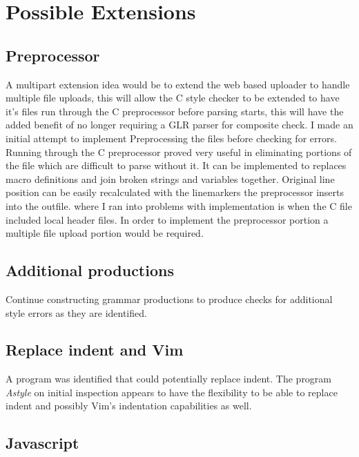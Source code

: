 \chapter{Possible Extensions}
\label{chap:EXTENSION}

\section{Preprocessor}

A multipart extension idea would be to extend the web based uploader to handle 
multiple file uploads, this will allow the C style checker to be extended to 
have it's files run through the C preprocessor before parsing starts, this will
have the added benefit of no longer requiring a GLR parser for composite check.
I made an initial attempt to implement Preprocessing the files before checking 
for errors. Running through the C preprocessor proved very useful in 
eliminating portions of the file which are difficult to parse without it. It 
can be implemented to replaces macro definitions and join broken strings and 
variables together. Original line position can be easily recalculated with the 
linemarkers the preprocessor inserts into the outfile. where I ran into 
problems with implementation is when the C file included local header files. 
In order to implement the preprocessor portion a multiple file upload portion 
would be required.
\section{Additional productions}

Continue constructing grammar productions to produce checks for additional 
style errors as they are identified.

\section{Replace indent and Vim}

A program was identified that could potentially replace indent. The program 
\emph{Astyle} on initial inspection appears to have the flexibility to be able 
to replace indent and possibly Vim's indentation capabilities as well.
\newpage
\section{Javascript}

